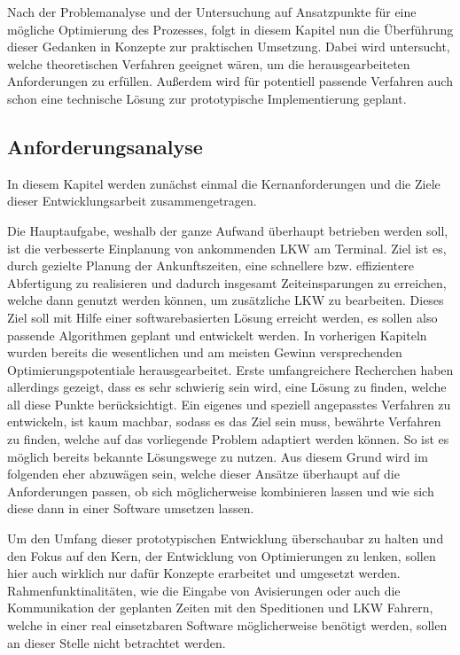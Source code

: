 Nach der Problemanalyse und der Untersuchung auf Ansatzpunkte für eine mögliche Optimierung des Prozesses, folgt in diesem Kapitel nun die Überführung dieser Gedanken in Konzepte zur praktischen Umsetzung. Dabei wird untersucht, welche theoretischen Verfahren geeignet wären, um die herausgearbeiteten Anforderungen zu erfüllen. Außerdem wird für potentiell passende Verfahren auch schon eine technische Lösung zur prototypische Implementierung geplant.

\subsection{Anforderungsanalyse}

In diesem Kapitel werden zunächst einmal die Kernanforderungen und die Ziele dieser Entwicklungsarbeit zusammengetragen.

Die Hauptaufgabe, weshalb der ganze Aufwand überhaupt betrieben werden soll, ist die verbesserte Einplanung von ankommenden LKW am Terminal. Ziel ist es, durch gezielte Planung der Ankunftszeiten, eine schnellere bzw. effizientere Abfertigung zu realisieren und dadurch insgesamt Zeiteinsparungen zu erreichen, welche dann genutzt werden können, um zusätzliche LKW zu bearbeiten. Dieses Ziel soll mit Hilfe einer softwarebasierten Lösung erreicht werden, es sollen also passende Algorithmen geplant und entwickelt werden. In vorherigen Kapiteln wurden bereits die wesentlichen und am meisten Gewinn versprechenden Optimierungspotentiale herausgearbeitet. Erste umfangreichere Recherchen haben allerdings gezeigt, dass es sehr schwierig sein wird, eine Lösung zu finden, welche all diese Punkte berücksichtigt. Ein eigenes und speziell angepasstes Verfahren zu entwickeln, ist kaum machbar, sodass es das Ziel sein muss, bewährte Verfahren zu finden, welche auf das vorliegende Problem adaptiert werden können. So ist es möglich bereits bekannte Lösungswege zu nutzen. Aus diesem Grund wird im folgenden eher abzuwägen sein, welche dieser Ansätze überhaupt auf die Anforderungen passen, ob sich möglicherweise kombinieren lassen und wie sich diese dann in einer Software umsetzen lassen.

Um den Umfang dieser prototypischen Entwicklung überschaubar zu halten und den Fokus auf den Kern, der Entwicklung von Optimierungen zu lenken, sollen hier auch wirklich nur dafür Konzepte erarbeitet und umgesetzt werden. Rahmenfunktinalitäten, wie die Eingabe von Avisierungen oder auch die Kommunikation der geplanten Zeiten mit den Speditionen und LKW Fahrern, welche in einer real einsetzbaren Software möglicherweise benötigt werden, sollen an dieser Stelle nicht betrachtet werden.

